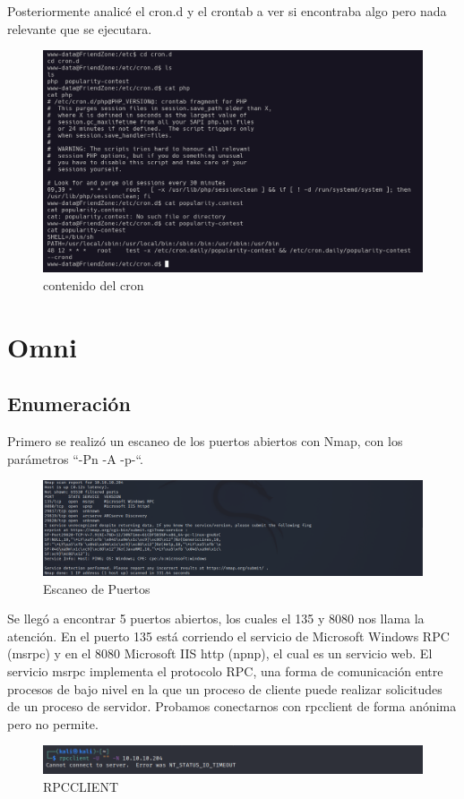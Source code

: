 \documentclass{article}
\begin{document}
Posteriormente analicé el cron.d y el crontab a ver si encontraba algo pero nada relevante que se ejecutara.

\begin{figure}[H]
	\center
	\includegraphics[width=\textwidth]{images/friendzone/vistazo-cron.png}
	\caption{contenido del cron}
\end{figure}


\clearpage 
\section{Omni}
\subsection{Enumeración}
Primero se realizó un escaneo de los puertos abiertos con Nmap, con los parámetros “-Pn -A -p-“.
\begin{figure}[H]
	\center
	\includegraphics[width=\textwidth]{images/omni/1.png}
	\caption{Escaneo de Puertos}
\end{figure}

Se llegó a encontrar 5 puertos abiertos, los cuales el 135 y 8080 nos llama la atención. En el puerto 135 está corriendo el servicio de Microsoft Windows RPC (msrpc) y en el 8080 Microsoft IIS http (npnp), el cual es un servicio web. El servicio msrpc implementa el protocolo RPC, una forma de comunicación entre procesos de bajo nivel en la que un proceso de cliente puede realizar solicitudes de un proceso de servidor.  Probamos conectarnos con rpcclient de forma anónima pero no permite.
\begin{figure}[H]
	\center
	\includegraphics[width=\textwidth]{images/omni/2.png}
	\caption{RPCCLIENT}
\end{figure}
\end{document}
